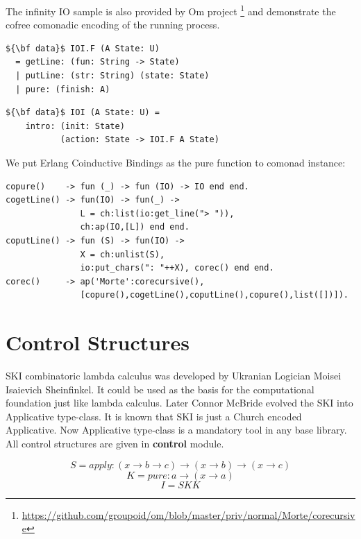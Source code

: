 \documentclass{article}
\begin{document}
The infinity IO sample is also provided by Om project \footnote{\url{https://github.com/groupoid/om/blob/master/priv/normal/Morte/corecursive}}
and demonstrate the cofree comonadic encoding of the running process.

\begin{lstlisting}[mathescape=true]
${\bf data}$ IOI.F (A State: U)
  = getLine: (fun: String -> State)
  | putLine: (str: String) (state: State)
  | pure: (finish: A)
\end{lstlisting}
\begin{lstlisting}[mathescape=true]
${\bf data}$ IOI (A State: U) =
    intro: (init: State)
           (action: State -> IOI.F A State)
\end{lstlisting}

We put Erlang Coinductive Bindings as the pure function to comonad instance:

\begin{lstlisting}[mathescape=true]
copure()    -> fun (_) -> fun (IO) -> IO end end.
cogetLine() -> fun(IO) -> fun(_) ->
               L = ch:list(io:get_line("> ")),
               ch:ap(IO,[L]) end end.
coputLine() -> fun (S) -> fun(IO) ->
               X = ch:unlist(S),
               io:put_chars(": "++X), corec() end end.
corec()     -> ap('Morte':corecursive(),
               [copure(),cogetLine(),coputLine(),copure(),list([])]).
\end{lstlisting}

\section{Control Structures}

SKI combinatoric lambda calculus was developed by Ukranian Logician
Moisei Isaievich Sheinfinkel. It could be used as the basis for the computational
foundation just like lambda calculus. Later Connor McBride \cite{McBride08} evolved the SKI
into Applicative type-class. It is known that SKI is just a Church encoded Applicative.
Now Applicative type-class is a mandatory tool in any base library.
All control structures are given in {\bf control} module.

\begin{equation}
 S = apply : (x \rightarrow b \rightarrow c) \rightarrow (x \rightarrow b) \rightarrow (x \rightarrow c)
\end{equation}
\begin{equation}
 K = pure  : a \rightarrow (x \rightarrow a)
\end{equation}
\begin{equation}
 I = S K K
\end{equation}
\end{document}
